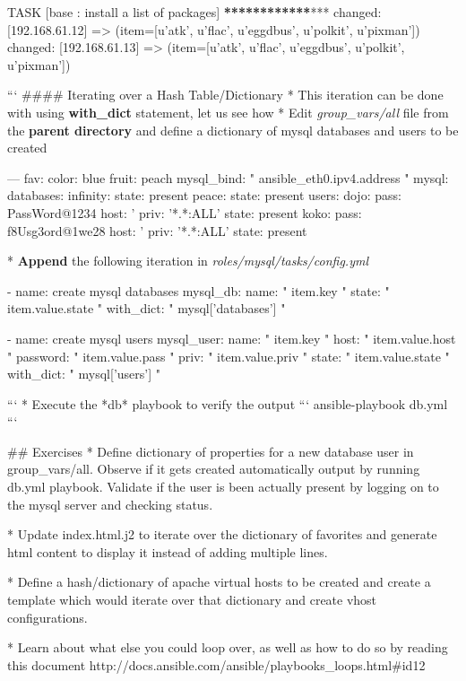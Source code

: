   TASK [base : install a list of packages] \textbf{**}\textbf{**}\textbf{**}\textbf{**}\textbf{**}\textbf{**}***
changed: [192.168.61.12] =\textgreater{} (item=[u'atk', u'flac', u'eggdbus', u'polkit', u'pixman'])
changed: [192.168.61.13] =\textgreater{} (item=[u'atk', u'flac', u'eggdbus', u'polkit', u'pixman'])

```\newline
\#\#\#\# Iterating over a Hash Table/Dictionary
  * This iteration can be done with using \textbf{with\_dict} statement, let us see how\newline
  * Edit \emph{group\_vars/all} file from the \textbf{parent directory} and define a dictionary of mysql databases and users to be created

\begin{code}
---
  fav:
    color: blue
    fruit: peach
  mysql_bind: "{{ ansible_eth0.ipv4.address }}"
  mysql:
    databases:
      infinity:
        state: present
      peace:
        state: present
    users:
      dojo:
        pass: PassWord@1234
        host: '%
        priv: '*.*:ALL'
        state: present
      koko:
        pass: f8Usg3ord@1we28
        host: '%
        priv: '*.*:ALL'
        state: present

\end{code}
  * \textbf{Append} the following iteration in \emph{roles/mysql/tasks/config.yml}

\begin{code}
  - name: create mysql databases
    mysql_db:
      name: "{{ item.key }}"
      state: "{{ item.value.state }}"
    with_dict: "{{ mysql['databases'] }}"

  - name: create mysql users
    mysql_user:
      name: "{{ item.key }}"
      host: "{{ item.value.host }}"
      password: "{{ item.value.pass }}"
      priv: "{{ item.value.priv }}"
      state: "{{ item.value.state }}"
    with_dict: "{{ mysql['users'] }}"

```  
  * Execute the *db* playbook to verify the output  
   ```
    ansible-playbook db.yml
   ```

## Exercises
  * Define dictionary of properties for a new database user  in group_vars/all. Observe if it gets created automatically  output by running db.yml playbook. Validate if the user is been actually present by logging on to the mysql server and checking status.

  * Update index.html.j2 to iterate over the dictionary of favorites and generate html content to display it instead of adding multiple lines.

  * Define a hash/dictionary  of apache virtual hosts to be created  and create a template which would iterate over that dictionary and create vhost configurations.

  * Learn about what else you could loop over, as well as how to do so by reading this document http://docs.ansible.com/ansible/playbooks_loops.html#id12
\end{code}